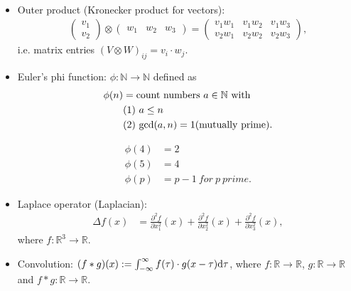 \documentclass[../../note.tex]{subfiles}
\begin{document}
\begin{itemize}
\begin{example}
\begin{align}
        \end{align}
    \end{example}
    \item Outer product (Kronecker product for vectors):
    \begin{align}
        \left(
            \begin{matrix}
                v_1  \\
                v_2
            \end{matrix}
        \right)
        \otimes
        \left(
            \begin{matrix}
                w_1 & w_2 & w_3
            \end{matrix}
        \right)
        =
        \left(
            \begin{matrix}
                v_1 w_1 & v_1 w_2 & v_1 w_3  \\
                v_2 w_1 & v_2 w_2 & v_2 w_3
            \end{matrix}
        \right),
    \end{align} 
    i.e. matrix entries $(V \otimes W)_{ij} = v_i \cdot w_j$.
    \item Euler's phi function: $\phi: \mathbb{N} \rightarrow \mathbb{N}$ defined as
    \begin{align}
        \phi(n)
        &= {\rm count~numbers}~a \in \mathbb{N}~{\rm with}\\
        &{\rm (1)}~a \leq n \\
        &{\rm (2)}~{\rm gcd}(a,n) = 1 (\rm mutually~prime).
    \end{align}
    \begin{example}
        \begin{align}
            \phi(4)
            &= 2 \\
            \phi(5) 
            &= 4 \\
            \phi(p)
            &= p-1~for~p~prime.
        \end{align}
    \end{example}
    \item Laplace operator (Laplacian): 
    \begin{align}
        \Delta f(x)
        &= \frac{\partial^2 f}{\partial x_1^2}(x)+\frac{\partial^2 f}{\partial x_2^2}(x)+\frac{\partial^2 f}{\partial x_3^2}(x),
    \end{align}
    where $f: \mathbb{R}^3 \rightarrow \mathbb{R}$.
    \item Convolution: $(f \ast g)(x):= \int_{-\infty}^{\infty} f(\tau) \cdot g(x- \tau){\rm d}\tau$, where $f: \mathbb{R}\rightarrow \mathbb{R}$, $g: \mathbb{R}\rightarrow \mathbb{R}$ and $f \ast g: \mathbb{R}\rightarrow \mathbb{R}$.

\end{itemize}
\end{document}
